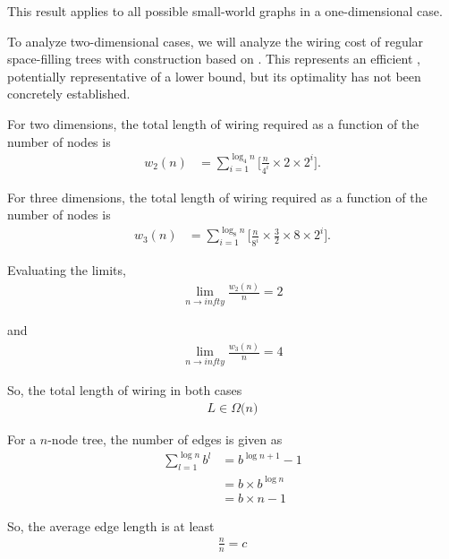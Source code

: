This result applies to all possible small-world graphs in a one-dimensional case.

To analyze two-dimensional cases, we will analyze the wiring cost of regular space-filling trees with construction based on \citep{kuffner2009space}.
This represents an efficient , potentially representative of a lower bound, but its optimality has not been concretely established.

For two dimensions, the total length of wiring required as a function of the number of nodes is
\begin{align*}
w_2(n)
&=
\sum_{i=1}^{\log_4 n} \Big[
  \frac{n}{4^i} %
  \times
  2 \times 2^{i} %
\Big].
\end{align*}

For three dimensions, the total length of wiring required as a function of the number of nodes is
\begin{align*}
w_3(n)
&=
\sum_{i=1}^{\log_8 n} \Big[
  \frac{n}{8^i} %
  \times
  \frac{3}{2} \times 8 \times 2^{i} %
\Big].
\end{align*}

Evaluating the limits,
\begin{align*}
\lim_{n \rightarrow infty}
\frac{w_2(n)}{n} = 2
\end{align*}

and
\begin{align*}
\lim_{n \rightarrow infty}
\frac{w_3(n)}{n} = 4
\end{align*}

So, the total length of wiring in both cases
\begin{align*}
L \in \Omega \Big( n )
\end{align*}

For a $n$-node tree, the number of edges is given as
\begin{align*}
\sum_{l = 1}^{\log n} b^{l}
&= b^{\log n + 1} - 1 \\
&= b \times b^{\log n} \\
&= b \times n - 1
\end{align*}

So, the average edge length is at least
\begin{align*}
\frac{n}{n} = c
\end{align*}
